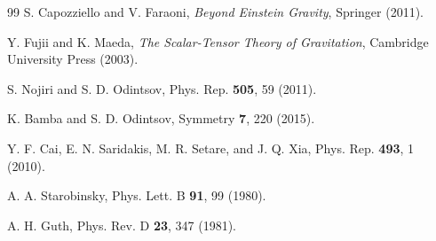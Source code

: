 \documentclass[aps,prd,reprint,superscriptaddress,floatfix]{revtex4-2}
\begin{document}
\begin{thebibliography}{99}
S. Capozziello and V. Faraoni, \emph{Beyond Einstein Gravity}, Springer (2011).

Y. Fujii and K. Maeda, \emph{The Scalar-Tensor Theory of Gravitation}, Cambridge University Press (2003).

S. Nojiri and S. D. Odintsov, Phys. Rep. \textbf{505}, 59 (2011).

K. Bamba and S. D. Odintsov, Symmetry \textbf{7}, 220 (2015).

Y. F. Cai, E. N. Saridakis, M. R. Setare, and J. Q. Xia, Phys. Rep. \textbf{493}, 1 (2010).

A. A. Starobinsky, Phys. Lett. B \textbf{91}, 99 (1980).

A. H. Guth, Phys. Rev. D \textbf{23}, 347 (1981).

\end{thebibliography}
\end{document}
